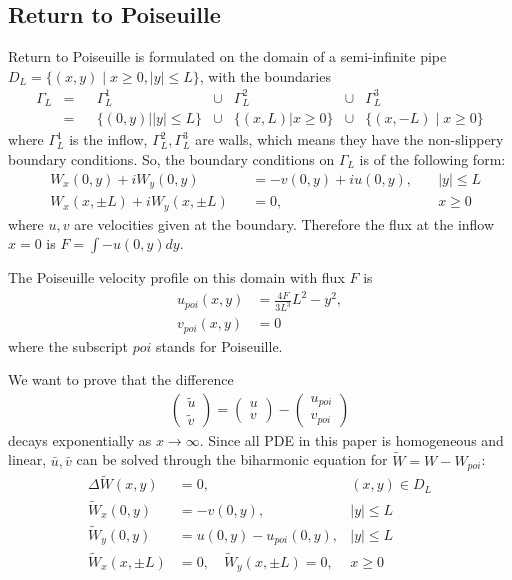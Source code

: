 \documentclass[11pt]{article}
\newtheorem[L]{thm}{Theorem}[section]
\begin{document}
\subsection{Return to Poiseuille} 
\label{sec:ret2poi}

Return to Poiseuille is formulated on the domain of a semi-infinite pipe $D_L = \{(x,y)\mid x \ge 0, |y| \le L\}$, with the boundaries 
\begin{align}
  \Gamma_L &=&& \Gamma_L^1\quad\quad\quad& \cup &\Gamma_L^2 &\cup&\Gamma_L^3 \\
  &=&&\{(0,y)||y| \le L \}& \cup &\{(x,L)|x\ge 0\} &\cup& \{(x,-L)\mid x\ge 0\}\nonumber
\end{align}
where $\Gamma_L^1$ is the inflow, $\Gamma_L^2,\Gamma_L^3$ are walls, which means they have the non-slippery boundary conditions. So, the boundary conditions on $\Gamma_L$ is of the following form: 
\begin{align}
  &W_x(0,y) + iW_y(0,y) &&= -v(0,y) + iu(0,y),& \quad |y|\le L\\
  &W_x(x,\pm L) + iW_y(x,\pm L) &&= 0,& \quad x\ge 0
\end{align}
where $u,v$ are velocities given at the boundary. Therefore the flux at the inflow $x=0$ is $F = \int -u(0,y) dy$. 

The Poiseuille velocity profile on this domain with flux $F$ is 
\begin{align}
  u_{poi}(x,y) &= \frac{4F}{3L^3} L^2 - y^2,\\
  v_{poi}(x,y) &= 0 
\end{align}
where the subscript $poi$ stands for Poiseuille. 

We want to prove that the difference 
\begin{align}
  \begin{pmatrix}
    \tilde u\\
    \tilde v
  \end{pmatrix} = 
  \begin{pmatrix}
    u\\v
  \end{pmatrix} - 
  \begin{pmatrix}
    u_{poi}\\v_{poi}
  \end{pmatrix}
\end{align}
decays exponentially as $x\to \infty$. Since all PDE in this paper is homogeneous and linear, $\bar u, \bar v$ can be solved through the biharmonic equation for $\tilde W = W - W_{poi}$:
\begin{align}
  \Delta \tilde W(x,y) &= 0, 
    &(x,y) \in D_L \label{ret2poi1} \\
  \tilde W_x(0,y)  &=  -v(0,y), 
     &|y| \le L \label{zero-flux-bc1}\\
  \tilde W_y(0,y)  &= u(0,y) - u_{poi}(0,y), 
     &|y| \le L \label{zero-flux-bc2}\\
  \tilde W_x(x,\pm L)  &= 0,\quad  \tilde W_y(x,\pm L) = 0, &x\ge 0 \label{zero-flux-bc3}
\end{align}
\end{document}
